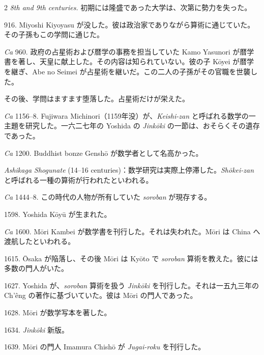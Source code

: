 \documentclass[11pt]{article}
\newcommand{\scanfooter}{}
\begin{document}
\begin{multicols}{2}
\columnbreak
\emph{8th and 9th centuries.} 初期には隆盛であった大学は、次第に勢力を失った。

916. Miyoshi Kiyoyasu が没した。彼は政治家でありながら算術に通じていた。その子孫もこの学問に通じた。

\emph{Ca} 960. 政府の占星術および暦学の事務を担当していた Kamo Yasunori が暦学書を著し、天皇に献上した。その内容は知られていない。彼の子 Kōyei が暦学を継ぎ、Abe no Seimei が占星術を継いだ。この二人の子孫がその官職を世襲した。

その後、学問はますます堕落した。占星術だけが栄えた。

\emph{Ca} 1156--8. Fujiwara Michinori（1159年没）が、\emph{Keishi-zan} と呼ばれる数学の一主題を研究した。一六二七年の Yoshida の \emph{Jinkōki} の一節は、おそらくその遺存であった。

\emph{Ca} 1200. Buddhist bonze Genshō が数学者として名高かった。

\emph{Ashikaga Shogunate} (14--16 centuries)：数学研究は実際上停滞した。\emph{Shōkei-zan} と呼ばれる一種の算術が行われたといわれる。

\emph{Ca} 1444--8. この時代の人物が所有していた \emph{soroban} が現存する。

1598. Yoshida Kōyū が生まれた。

\emph{Ca} 1600. Mōri Kambei が数学書を刊行した。それは失われた。Mōri は China へ渡航したといわれる。

1615. Ōsaka が陥落し、その後 Mōri は Kyōto で \emph{soroban} 算術を教えた。彼には多数の門人がいた。

1627. Yoshida が、\emph{soroban} 算術を扱う \emph{Jinkōki} を刊行した。それは一五九三年の Ch'êng の著作に基づいていた。彼は Mōri の門人であった。

1628. Mōri が数学写本を著した。

1634. \emph{Jinkōki} 新版。

1639. Mōri の門人 Imamura Chishō が \emph{Jugai-roku} を刊行した。
\end{multicols}
\scanfooter
\end{document}

